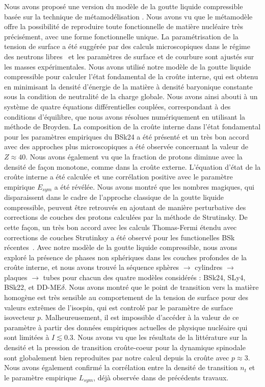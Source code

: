 Nous avons proposé une version du modèle de la goutte liquide compressible
basée sur la technique de métamodélisation 
\cite{Margueron2018a,Margueron2018b}. Nous avons vu que le métamodèle offre la 
possibilité de reproduire toute fonctionnelle de matière nucléaire très 
précisément, avec une forme fonctionnelle unique. La paramétrisation de 
la tension de surface a été suggérée par des calculs microscopiques dans le 
régime des neutrons libres~\cite{Ravenhall1983} et les paramètres de surface et 
de courbure sont ajustés sur les masses expérimentales. Nous avons utilisé 
notre modèle de la goutte liquide compressible pour calculer l'état fondamental 
de la croûte interne, qui est obtenu en minimisant la densité d'énergie de la 
matière à densité baryonique constante sous la condition de neutralité 
de la charge globale. Nous avons ainsi abouti à un système de quatre équations 
différentielles couplées, correspondant à des conditions d'équilibre, que nous 
avons résolues numériquement en utilisant la méthode de Broyden.
%
La composition de la croûte interne dans l'état fondamental pour les paramètres 
empiriques du BSk24 a été présenté et un très bon accord avec des approches 
plus microscopiques a été observée concernant la valeur de $Z \approx 40$. Nous 
avons également vu que la fraction de protons diminue avec la densité de façon 
monotone, comme dans la croûte externe. 
L'équation d'état de la croûte interne a été calculée et une corrélation 
positive avec le paramètre empirique $E_{sym}$ a été révélée. Nous avons montré 
que les nombres magiques, qui disparaissent dans le cadre de l'approche
classique de la goutte liquide compressible, peuvent être retrouvés en ajoutant 
de manière perturbative des corrections de couches des protons calculées par la 
méthode de Strutinsky. De cette façon, un très bon accord avec les calculs
Thomas-Fermi étendu avec corrections de couches Strutinksy a été observé pour 
les functionelles BSk récentes~\cite{Pearson2018}. Avec notre modèle de la
goutte liquide compressible, nous avons exploré la présence de phases 
non sphériques dans les couches profondes de la croûte interne, et nous avons 
trouvé la séquence sphères $\rightarrow$ cylindres $\rightarrow$ plaques
$\rightarrow$ tubes pour chacun des quatre modèles considérés : BSk24, SLy4, 
BSk22, et DD-ME$\delta$. Nous avons montré que le point de transition vers la 
matière homogène est très sensible au comportement de la tension de surface
pour des valeurs extrêmes de l'isospin, qui est controlé par le paramètre de 
surface isovecteur $p$.
%
Malheureusement, il est impossible d'accéder à la valeur de ce paramètre à 
partir des données empiriques actuelles de physique nucléaire 
qui sont limitées à $I \lesssim 0.3$. Nous avons vu que 
les résultats de la littérature sur la densité et la pression de transition
croûte-coeur pour la dynamique spinodale~\cite{Ducoin2011} sont globalement 
bien reproduites par notre calcul depuis la croûte avec $p \approx 3$. Nous 
avons également confirmé la corrélation entre la densité de transition $n_t$ et 
le paramètre empirique $L_{sym}$, déjà observée dans de précédents travaux.

